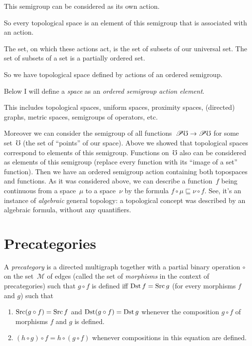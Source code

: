 This semigroup can be considered as its own action.

So every topological space is an element of this semigroup that is associated with an action.

The set, on which these actions act, is the set of subsets of our universal set. The set of subsets of a set is a partially ordered set.

So we have topological space defined by actions of an ordered semigroup.

Below I will define a \emph{space} as an \emph{ordered semigroup action element}.

This includes topological spaces, uniform spaces, proximity spaces, (directed) graphs, metric spaces, semigroups of operators, etc.

Moreover we can consider the semigroup of all functions~$\mathscr{P}\mho\to\mathscr{P}\mho$ for some set~$\mho$ (the set of ``points'' of our space). Above we showed that topological spaces correspond to elements of this semigroup. Functions on~$\mho$ also can be considered as elements of this semigroup (replace every function with its ``image of a set'' function). Then we have an ordered semigroup action containing both topospaces and functions. As it was considered above, we can describe a function~$f$ being continuous from a space~$\mu$ to a space~$\nu$ by the formula $f\circ\mu\sqsubseteq\nu\circ f$. See, it's an instance of \emph{algebraic} general topology: a topological concept was described by an algebraic formula, without any quantifiers.

\chapter{Precategories}

\begin{defn}
A \emph{precategory} is a directed multigraph
together with a partial binary operation $\circ$ on the set~$\mathcal{M}$ of edges (called the set of \emph{morphisms} in the context of precategories)
such that $g\circ f$ is defined iff $\operatorname{Dst} f=\operatorname{Src} g$ (for every morphisms
$f$ and $g$) such that
\begin{enumerate}
\item $\operatorname{Src}(g\circ f)=\operatorname{Src} f$ and $\operatorname{Dst}(g\circ f)=\operatorname{Dst} g$ whenever the
composition $g\circ f$ of morphisms $f$ and $g$ is defined.
\item $(h\circ g)\circ f=h\circ(g\circ f)$ whenever compositions in this
equation are defined.
\end{enumerate}
\end{defn}

